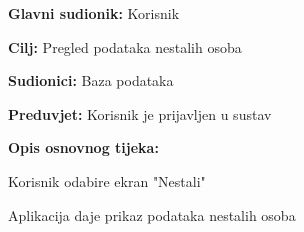 				    \noindent {}
					\begin{packed_item}
	
						\item \textbf{Glavni sudionik: }Korisnik
						\item  \textbf{Cilj:} Pregled podataka nestalih osoba
						\item  \textbf{Sudionici:} Baza podataka
						\item  \textbf{Preduvjet:} Korisnik je prijavljen u sustav
						\item  \textbf{Opis osnovnog tijeka:}
						
						\item[] \begin{packed_enum}
	
							\item Korisnik odabire ekran "Nestali"
							\item Aplikacija daje prikaz podataka nestalih osoba
						\end{packed_enum}
						
					
					\end{packed_item}
					
